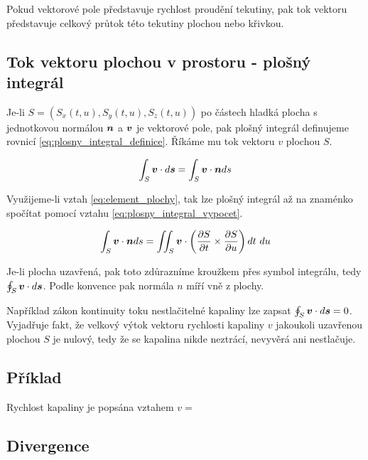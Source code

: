 Pokud vektorové pole představuje rychlost proudění tekutiny, pak tok vektoru představuje celkový průtok této tekutiny plochou nebo křivkou.

\subsection{Tok vektoru plochou v prostoru - plošný integrál}

Je-li \(S = \left(S_x(t, u), S_y(t, u), S_z(t, u)\right)\) po částech hladká plocha s jednotkovou normálou \(\boldsymbol{n}\) a \(\boldsymbol{v}\) je vektorové pole,
pak plošný integrál definujeme rovnicí \eqref{eq:plosny_integral_definice}. Říkáme mu tok vektoru \(v\) plochou \(S\).


\begin{equation}
\label{eq:plosny_integral_definice}
\begin{split}
\int_S \boldsymbol{v} \cdot d\boldsymbol{s} = \int_S \boldsymbol{v} \cdot \boldsymbol{n} ds
\end{split}
\end{equation}

Využijeme-li vztah \eqref{eq:element_plochy}, tak lze plošný integrál až na znaménko spočítat pomocí vztahu \eqref{eq:plosny_integral_vypocet}.

\begin{equation}
\label{eq:plosny_integral_vypocet}
\begin{split}
\int_S \boldsymbol{v} \cdot \boldsymbol{n} ds = \iint_S \boldsymbol{v} \cdot \left (\frac{\partial S}{\partial t} \times \frac{\partial S}{\partial u}\right) dt \ du
\end{split}
\end{equation}

Je-li plocha uzavřená, pak toto zdůrazníme kroužkem přes symbol integrálu, tedy \(\oint_S \boldsymbol{v} \cdot d\boldsymbol{s}\). Podle konvence pak normála \(n\) míří vně z plochy.

Například zákon kontinuity toku nestlačitelné kapaliny lze zapsat \(\oint_S \boldsymbol{v} \cdot d\boldsymbol{s} = 0\). Vyjadřuje fakt, že velkový výtok vektoru rychlosti kapaliny \(v\) jakoukoli uzavřenou plochou \(S\) je nulový, tedy že se kapalina nikde neztrácí, nevyvěrá ani nestlačuje. 

\subsection{Příklad}

Rychlost kapaliny je popsána vztahem \(v = \)

\subsection{Divergence}
\label{sec:divergence}


